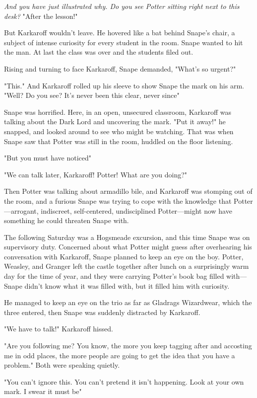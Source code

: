 \emph{And you have just illustrated why. Do you see Potter sitting right next to this desk?} "After the lesson!"

But Karkaroff wouldn't leave. He hovered like a bat behind Snape's chair, a subject of intense curiosity for every student in the room. Snape wanted to hit the man. At last the class was over and the students filed out.

Rising and turning to face Karkaroff, Snape demanded, "What's so urgent?"

"This." And Karkaroff rolled up his sleeve to show Snape the mark on his arm. "Well? Do you see? It's never been this clear, never since{\el}"

Snape was horrified. Here, in an open, unsecured classroom, Karkaroff was talking about the Dark Lord and uncovering the mark. "Put it away!" he snapped, and looked around to see who might be watching. That was when Snape saw that Potter was still in the room, huddled on the floor listening.

"But you must have noticed{\el}"

"We can talk later, Karkaroff! Potter! What are you doing?"

Then Potter was talking about armadillo bile, and Karkaroff was stomping out of the room, and a furious Snape was trying to cope with the knowledge that Potter—arrogant, indiscreet, self-centered, undisciplined Potter—might now have something he could threaten Snape with.

The following Saturday was a Hogsmeade excursion, and this time Snape was on supervisory duty. Concerned about what Potter might guess after overhearing his conversation with Karkaroff, Snape planned to keep an eye on the boy. Potter, Weasley, and Granger left the castle together after lunch on a surprisingly warm day for the time of year, and they were carrying Potter's book bag filled with—Snape didn't know what it was filled with, but it filled him with curiosity.

He managed to keep an eye on the trio as far as Gladrags Wizardwear, which the three entered, then Snape was suddenly distracted by Karkaroff.

"We have to talk!" Karkaroff hissed.

"Are you following me? You know, the more you keep tagging after and accosting me in odd places, the more people are going to get the idea that you have a problem." Both were speaking quietly.

"You can't ignore this. You can't pretend it isn't happening. Look at your own mark. I swear it must be{\el}"

